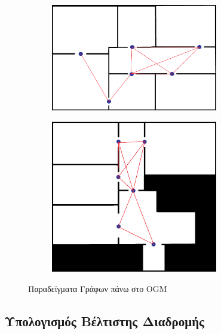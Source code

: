 \begin{figure}[h]
     \centering
     \captionsetup{justification=centering}
     \begin{subfigure}[b]{0.5\textwidth}
         \centering
         \includegraphics[width=0.8\textwidth]{./images/chapter5/graph_on_map_1.png}
         \label{fig:graph_on_map_1}
     \end{subfigure}%
     \begin{subfigure}[b]{0.5\textwidth}
         \centering
         \includegraphics[width=0.8\textwidth]{./images/chapter5/graph_on_map_2.png}
         \label{fig:graph_on_map_2}
     \end{subfigure}
     \caption{Παραδείγματα Γράφων πάνω στο OGM}
    \label{fig:graph_on_map_examples}
\end{figure}




\subsection{Υπολογισμός Βέλτιστης Διαδρομής}
\label{subsection:room_sequence_implementation}

